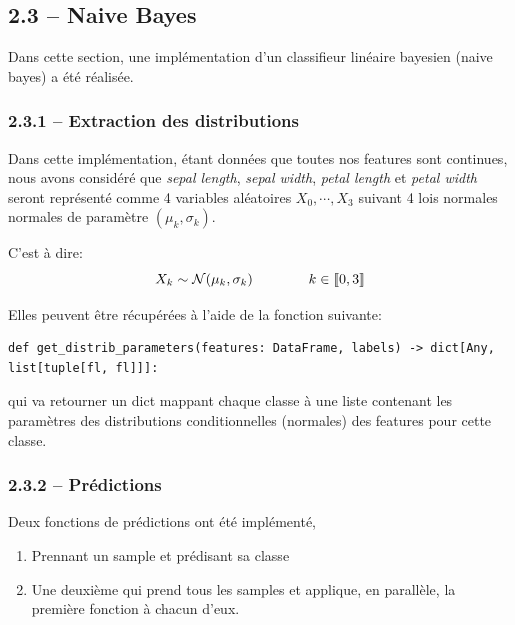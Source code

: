 \documentclass[
]{article}
\providecommand{\tightlist}{%
  \setlength{\itemsep}{0pt}\setlength{\parskip}{0pt}}
\begin{document}
\hypertarget{naive-bayes-1}{%
\subsection{2.3 -- Naive Bayes}\label{naive-bayes-1}}

Dans cette section, une implémentation d'un classifieur linéaire
bayesien (naive bayes) a été réalisée.

\hypertarget{extraction-des-distributions}{%
\subsubsection{2.3.1 -- Extraction des
distributions}\label{extraction-des-distributions}}

Dans cette implémentation, étant données que toutes nos features sont
continues, nous avons considéré que \emph{sepal length}, \emph{sepal
width}, \emph{petal length} et \emph{petal width} seront représenté
comme 4 variables aléatoires \(X_0, \cdots, X_3\) suivant 4 lois
normales normales de paramètre \((\mu_k, \sigma_k)\).

C'est à dire: \[
X_k \sim \mathcal{N}( \mu_k, \sigma_k) \qquad \qquad k \in \llbracket{0, 3}\rrbracket
\]

Elles peuvent être récupérées à l'aide de la fonction suivante:

\begin{lstlisting}
def get_distrib_parameters(features: DataFrame, labels) -> dict[Any, list[tuple[fl, fl]]]:
\end{lstlisting}

qui va retourner un dict mappant chaque classe à une liste contenant les
paramètres des distributions conditionnelles (normales) des features
pour cette classe.

\hypertarget{pruxe9dictions-1}{%
\subsubsection{2.3.2 -- Prédictions}\label{pruxe9dictions-1}}

Deux fonctions de prédictions ont été implémenté,

\begin{enumerate}
\def\labelenumi{\arabic{enumi}.}
\tightlist
\item
  Prennant un sample et prédisant sa classe
\item
  Une deuxième qui prend tous les samples et applique, en parallèle, la
  première fonction à chacun d'eux.
\end{enumerate}
\end{document}
